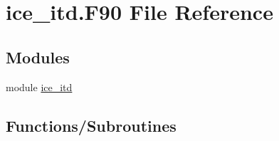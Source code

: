 \hypertarget{ice__itd_8F90}{
\section{ice\_\-itd.F90 File Reference}
\label{ice__itd_8F90}
}
\subsection*{Modules}
\begin{DoxyCompactItemize}
\item 
module \hyperlink{namespaceice__itd}{ice\_\-itd}
\end{DoxyCompactItemize}
\subsection*{Functions/Subroutines}
